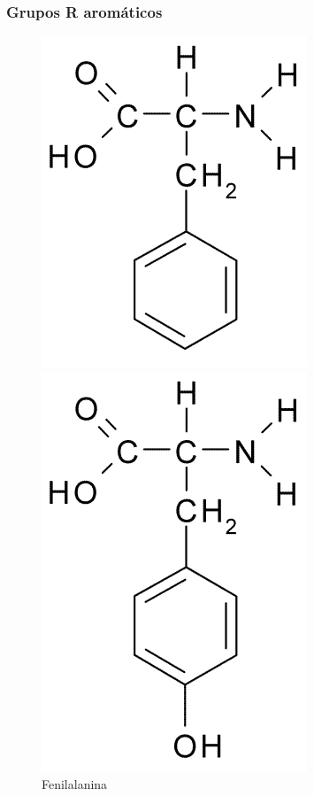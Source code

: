 \documentclass[a4paper,12pt]{article}
\begin{document}
	\subsubsection*{Grupos R aromáticos}
	\begin{figure}[H]
		\begin{center}
			\begin{minipage}{0.3\linewidth}
				\centering   
				\includegraphics[width=0.7\linewidth]{phenylalanine.png}	
				\caption{Fenilalanina}
				\label{fig:phenylalanine}
			\end{minipage}
			\begin{minipage}{0.3\linewidth}
				\centering   
				\includegraphics[width=0.59\linewidth]{tyrosine.png}

\end{minipage}
\end{center}
\end{figure}
\end{document}
